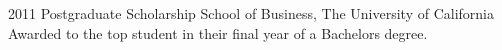 \documentclass[]{k-cv} %
\begin{document}
\begin{entrylist}
\entry
{2011}
{Postgraduate Scholarship}
{School of Business, The University of California}
{Awarded to the top student in their final year of a Bachelors degree.}
\end{entrylist}

\clearpage




\end{document}
